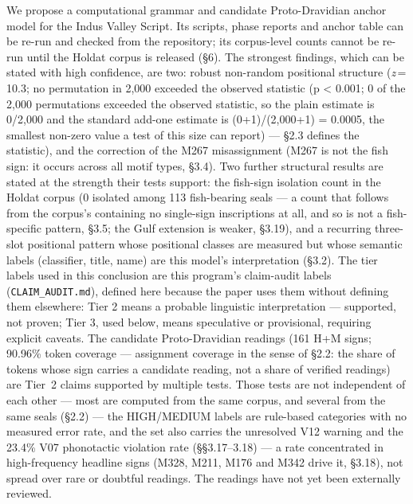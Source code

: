 \documentclass[
]{article}
\begin{document}
We propose a computational grammar and candidate Proto-Dravidian anchor
model for the Indus Valley Script. Its scripts, phase reports and anchor
table can be re-run and checked from the repository; its corpus-level
counts cannot be re-run until the Holdat corpus is released (§6). The strongest findings, which can be stated with high confidence, are two: robust non-random positional structure (\textit{z}\,=\,10.3; no permutation in 2,000 exceeded the observed statistic (p \textless{} 0.001; 0 of the 2,000 permutations exceeded the observed statistic, so the plain estimate is 0/2,000 and the standard add-one estimate is (0+1)/(2,000+1) = 0.0005, the smallest non-zero value a test of this size can report) --- §2.3 defines the statistic), and the correction of the M267 misassignment (M267 is not the fish sign: it occurs across all motif types, §3.4). Two further structural results are stated at the strength their tests support: the fish-sign isolation count in the Holdat corpus (0 isolated among 113 fish-bearing seals --- a count that follows from the corpus's containing no single-sign inscriptions at all, and so is not a fish-specific pattern, §3.5; the Gulf extension is weaker, §3.19), and a recurring three-slot positional pattern whose positional classes are measured but whose semantic labels (classifier, title, name) are this model's interpretation (§3.2). The tier labels used in this conclusion are this program's claim-audit labels (\texttt{CLAIM\_AUDIT.md}), defined here because the paper uses them without defining them elsewhere: Tier 2 means a probable linguistic interpretation --- supported, not proven; Tier 3, used below, means speculative or provisional, requiring explicit caveats. The candidate Proto-Dravidian readings (161 H+M signs; 90.96\% token coverage --- assignment coverage in the sense of §2.2: the share of tokens whose sign carries a candidate reading, not a share of verified readings) are Tier~2 claims supported by multiple tests. Those tests are not independent of each other --- most are computed from the same corpus, and several from the same seals (§2.2) --- the HIGH/MEDIUM labels are rule-based categories with no measured error rate, and the set also carries the unresolved V12 warning and the 23.4\% V07 phonotactic violation rate (§§3.17--3.18) --- a rate concentrated in high-frequency headline signs (M328, M211, M176 and M342 drive it, §3.18), not spread over rare or doubtful readings. The readings have not yet been externally reviewed.
\end{document}
